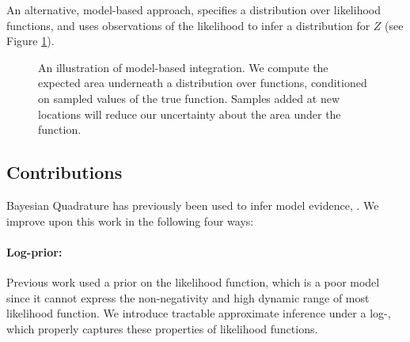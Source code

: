 \documentclass{article}
\begin{document}
An alternative, model-based approach, specifies a distribution over likelihood functions, and uses observations of the likelihood to infer a distribution for $Z$ (see Figure \ref{fig:model_based}).

\begin{figure}
\centering
{}
\caption{An illustration of model-based integration.  We compute the expected area underneath a distribution over functions, conditioned on sampled values of the true function.  Samples added at new locations will reduce our uncertainty about the area under the function.}
\label{fig:model_based}
\end{figure}


\subsection{Contributions}\label{sec:ev}

Bayesian Quadrature has previously been used to infer model evidence, \citep{BZMonteCarlo}.  We improve upon this work in the following four ways:

\paragraph*{Log-prior:} Previous work used a \gpb prior on the likelihood function, which is a poor model since it cannot express the non-negativity and high dynamic range of most likelihood function.  We introduce tractable approximate inference under a log-\gp, which properly captures these properties of likelihood functions.

\end{document}
